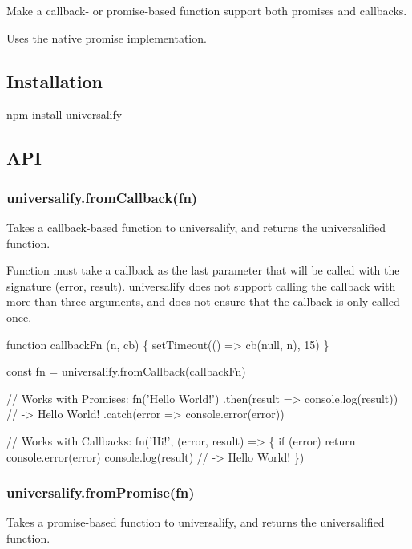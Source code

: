 \href{https://travis-ci.org/RyanZim/universalify}{\tt }

Make a callback-\/ or promise-\/based function support both promises and callbacks.

Uses the native promise implementation.

\subsection*{Installation}


\begin{DoxyCode}
npm install universalify
\end{DoxyCode}


\subsection*{A\+PI}

\subsubsection*{{\ttfamily universalify.\+from\+Callback(fn)}}

Takes a callback-\/based function to universalify, and returns the universalified function.

Function must take a callback as the last parameter that will be called with the signature {\ttfamily (error, result)}. {\ttfamily universalify} does not support calling the callback with more than three arguments, and does not ensure that the callback is only called once.


\begin{DoxyCode}
function callbackFn (n, cb) \{
  setTimeout(() => cb(null, n), 15)
\}

const fn = universalify.fromCallback(callbackFn)

// Works with Promises:
fn('Hello World!')
.then(result => console.log(result)) // -> Hello World!
.catch(error => console.error(error))

// Works with Callbacks:
fn('Hi!', (error, result) => \{
  if (error) return console.error(error)
  console.log(result)
  // -> Hello World!
\})
\end{DoxyCode}


\subsubsection*{{\ttfamily universalify.\+from\+Promise(fn)}}

Takes a promise-\/based function to universalify, and returns the universalified function.


